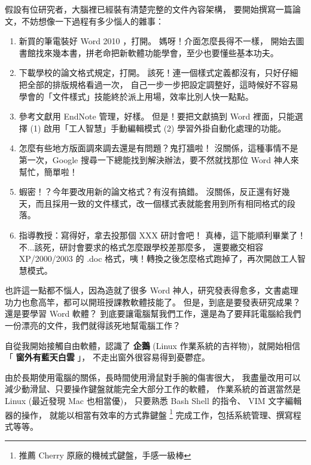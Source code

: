 \documentclass[a4paper,12pt,english]{sphinxmanual}
\begin{document}
假設有位研究者，大腦裡已經裝有清楚完整的文件內容架構，
要開始撰寫一篇論文，不妨想像一下過程有多少惱人的雜事：
\begin{enumerate}
\item {} 
新買的筆電裝好 Word 2010 ，打開。
媽呀！介面怎麼長得不一樣，
開始去圖書館找來幾本書，拼老命把新軟體功能學會，至少也要懂些基本功夫。

\item {} 
下載學校的論文格式規定，打開。
該死！連一個樣式定義都沒有，只好仔細把全部的排版規格看過一次，
自己一步一步把設定調整好，這時候好不容易學會的「文件樣式」技能終於派上用場，效率比別人快一點點。

\item {} 
參考文獻用 EndNote 管理，好樣。
但是！要把文獻搞到 Word 裡面，只能選擇 (1) 啟用「工人智慧」手動編輯模式 (2) 學習外掛自動化處理的功能。

\item {} 
怎麼有些地方版面調來調去還是有問題？鬼打牆啦！
沒關係，這種事情不是第一次，Google 搜尋一下總能找到解決辦法，要不然就找那位 Word 神人來幫忙，簡單啦！

\item {} 
蝦密！？今年要改用新的論文格式？有沒有搞錯。
沒關係，反正還有好幾天，而且採用一致的文件樣式，改一個樣式表就能套用到所有相同格式的段落。

\item {} 
指導教授：寫得好，拿去投那個 XXX 研討會吧！
真棒，這下能順利畢業了！不...該死，研討會要求的格式怎麼跟學校差那麼多，
還要繳交相容 XP/2000/2003 的 .doc 格式，咦！轉換之後怎麼格式跑掉了，再次開啟工人智慧模式。

\end{enumerate}

也許這一點都不惱人，因為造就了很多 Word 神人，研究發表得愈多，文書處理功力也愈高竿，都可以開班授課教軟體技能了。
但是，到底是要發表研究成果？還是要學習 Word 軟體？
到底要讓電腦幫我們工作，還是為了要拜託電腦給我們一份漂亮的文件，我們就得該死地幫電腦工作？

自從我開始接觸自由軟體，認識了 \textbf{企鵝} (Linux 作業系統的吉祥物)，就開始相信「 \textbf{窗外有藍天白雲} 」，
不走出窗外很容易得到憂鬱症。

由於長期使用電腦的關係，長時間使用滑鼠對手腕的傷害很大，
我盡量改用可以減少動滑鼠、只要操作鍵盤就能完全大部分工作的軟體，
作業系統的首選當然是 Linux (最近發現 Mac 也相當優)，
只要熟悉 Bash Shell 的指令、 VIM 文字編輯器的操作，
就能以相當有效率的方式靠鍵盤 \footnote{
推薦 Cherry 原廠的機械式鍵盤，手感一級棒
} 完成工作，包括系統管理、撰寫程式等等。
\end{document}
